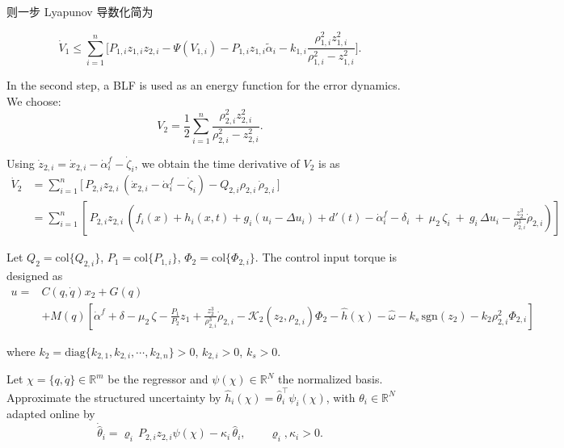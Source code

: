\documentclass[pdflatex,sn-mathphys-num]{sn-jnl}%
\theoremstyle{thmstyleone}%
\theoremstyle{thmstyletwo}%
\theoremstyle{thmstylethree}%
\begin{document}
则一步 Lyapunov 导数化简为

$$
\dot V_1
\le \sum_{i=1}^n \Big[ P_{1,i}z_{1,i} z_{2,i}
-\Psi(V_{1,i})-P_{1,i}z_{1,i}\tilde\alpha_i- k_{1,i}\frac{\rho_{1,i}^2 z_{1,i}^2}{\rho_{1,i}^2-z_{1,i}^2} 
\Big].
$$


In the second step, a BLF is used as an energy function for the error dynamics. We choose:
\begin{equation}\label{eq:25}
	V_2= \frac{1}{2}\sum_{i=1}^{n} \frac{\rho_{2,i}^2 z_{2,i}^2}{\rho_{2,i}^2-z_{2,i}^2}. 
\end{equation}


Using $\dot z_{2,i}=\dot x_{2,i}-\dot\alpha_i^{f}-\dot\zeta_i$, we obtain the time derivative of $V_2$ is as
\begin{equation}
	\begin{aligned}
		\dot V_2& = \sum_{i=1}^n \Big[\,P_{2,i}z_{2,i}\,(\dot x_{2,i}-\dot\alpha_i^{f}-\dot\zeta_i)-Q_{2,i}\rho_{2,i}\,\dot\rho_{2,i}\,\Big]\\
		&
		 = \sum_{i=1}^n \left[\,P_{2,i}z_{2,i}\,\left(f_i(x)+h_i(x,t)+g_i(u_i-\Delta u_i)+d'(t)-\dot\alpha_i^{f}-\delta_i\ +\ \mu_2\,\zeta_i\ +\ g_i\,\Delta u_i-\tfrac{z_{2}^{3}}{\rho_{2,i}^{3}}\dot\rho_{2,i} \right)\right]
	\end{aligned}
\end{equation}

Let $Q_2=\mathrm{col}\{Q_{2,i}\}$,
$P_1=\mathrm{col}\{P_{1,i}\}$,
$\Phi_2=\mathrm{col}\{\Phi_{2,i}\}$. The control input torque is designed as
\begin{equation}\label{eq:tau-cmd}
\begin{aligned}
u =&C(q,\dot{q})x_2 + G(q)\\
&+M(q)\left[\dot\alpha^{f}+\delta -\mu_2\,\zeta-\frac{P_1}{P_2}z_1+\tfrac{z_{2}^{3}}{\rho_{2,i}^{3}}\dot\rho_{2,i}-\mathcal{K}_{2}(z_{2},\rho_{2,i}) \Phi_{2}
-\hat{h}(\chi)
-\hat \omega
-k_s\,\mathrm{sgn}(z_{2})-k_{2}\rho_{2,i}^2 \Phi_{2,i}\right]
\end{aligned}
\end{equation}


where $k_2=\mathrm{diag}\{k_{2,1},k_{2,i},\cdots,k_{2,n}\}>0$, $k_{2,i}>0$, $k_s>0$.

Let $\chi=\{q,\dot{q}\}\in\mathbb{R}^m$ be the regressor and $\psi(\chi)\in\mathbb{R}^{N}$ the normalized basis. Approximate the structured uncertainty by 
\( \hat h_i(\chi)=\hat \theta_i^\top \psi_i(\chi)\),
with $\theta_i\in\mathbb{R}^{N}  $ adapted online by
\begin{equation}\label{eq:theta-law}
\dot{\hat{\theta}}_i = \varrho_i\,P_{2,i} z_{2,i}\psi(\chi) - \kappa_i\,\hat{\theta}_i,\qquad
\varrho_i,\kappa_i>0.
\end{equation}
\end{document}
